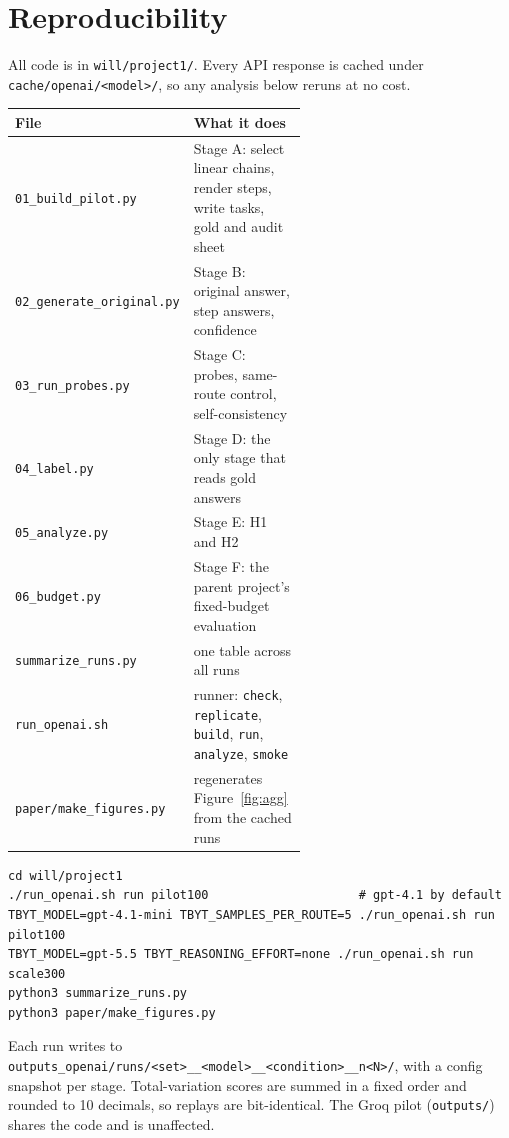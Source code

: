 \documentclass[11pt]{article}
\newcommand{\code}[1]{\texttt{#1}}
\begin{document}
\appendix
\section{Reproducibility}

All code is in \code{will/project1/}. Every API response is cached under
\code{cache/openai/<model>/}, so any analysis below reruns at no cost.

\begin{center}
\small
\begin{tabular}{lp{0.58\linewidth}}
\toprule
File & What it does \\
\midrule
\code{01\_build\_pilot.py} & Stage A: select linear chains, render steps, write tasks, gold and audit sheet \\
\code{02\_generate\_original.py} & Stage B: original answer, step answers, confidence \\
\code{03\_run\_probes.py} & Stage C: probes, same-route control, self-consistency \\
\code{04\_label.py} & Stage D: the only stage that reads gold answers \\
\code{05\_analyze.py} & Stage E: H1 and H2 \\
\code{06\_budget.py} & Stage F: the parent project's fixed-budget evaluation \\
\code{summarize\_runs.py} & one table across all runs \\
\code{run\_openai.sh} & runner: \code{check}, \code{replicate}, \code{build}, \code{run}, \code{analyze}, \code{smoke} \\
\code{paper/make\_figures.py} & regenerates Figure~\ref{fig:agg} from the cached runs \\
\bottomrule
\end{tabular}
\end{center}

\begin{verbatim}
cd will/project1
./run_openai.sh run pilot100                     # gpt-4.1 by default
TBYT_MODEL=gpt-4.1-mini TBYT_SAMPLES_PER_ROUTE=5 ./run_openai.sh run pilot100
TBYT_MODEL=gpt-5.5 TBYT_REASONING_EFFORT=none ./run_openai.sh run scale300
python3 summarize_runs.py
python3 paper/make_figures.py
\end{verbatim}

Each run writes to \code{outputs\_openai/runs/<set>\_\_<model>\_\_<condition>\_\_n<N>/}, with
a config snapshot per stage. Total-variation scores are summed in a fixed order and rounded
to 10 decimals, so replays are bit-identical. The Groq pilot (\code{outputs/}) shares the
code and is unaffected.
\end{document}
